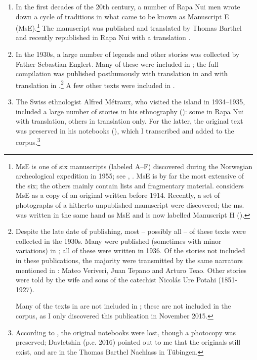 \newpage
\begin{enumerate}
\item 
In the first decades of the 20th century, a number of Rapa Nui men wrote down a cycle of traditions in what came to be known as Manuscript E (MsE).\footnote{\label{fn:27}MsE is one of six manuscripts (labeled A–F) discovered during the Norwegian archeological expedition in 1955; see \citet{Barthel1965}, \citet{HorleyLópezLabbé2014}. MsE is by far the most extensive of the six; the others mainly contain lists and fragmentary material. \citet[298]{Barthel1978} considers MsE as a copy of an original written before 1914. Recently, a set of photographs of a hitherto unpublished manuscript were discovered; the ms. was written in the same hand as MsE and is now labelled Manuscript H (\citealt{HorleyLópezLabbé2014,HorleyLópezLabbé2015}).} The manuscript was published and translated by Thomas Barthel \citep{Barthel1978} and recently republished in Rapa Nui with a  translation \citep{Frontier2008}. 

\item 
In the 1930s, a large number of legends and other stories was collected by Father Sebastian Englert. Many of these were included in \citet{Englert1939Huru1,Englert1939Huru2,Englert1939Tradiciones}; the full compilation was published posthumously with  translation in \citet{Englert1980} and with  translation in \citet{Englert2001}.\footnote{\label{fn:28}Despite the late date of publishing, most – possibly all – of these texts were collected in the 1930s. Many were published (sometimes with minor variations) in \citet{Englert1939Huru1,Englert1939Huru2,Englert1939Tradiciones}; all of these were written in 1936. Of the stories not included in these publications, the majority were transmitted by the same narrators mentioned in \citet{Englert1939Huru1,Englert1939Huru2,Englert1939Tradiciones}: Mateo Veriveri, Juan Tepano and Arturo Teao. Other stories were told by the wife and sons of the catechist Nicolás Ure Potahi (1851-1927). 

Many of the texts in \citet{Englert1939Huru2} are not included in \citet{Englert1980}; these are not included in the corpus, as I only discovered this publication in November 2015.} A few other texts were included in \citet{Englert1948}.

\item 
The Swiss ethnologist Alfred Métraux, who visited the island in 1934–1935, included a large number of stories in his ethnography (\citealt{Métraux1971}): some in Rapa Nui with translation, others in translation only. For the latter, the original text was preserved in his notebooks (\citealt{Métraux1935}), which I transcribed and added to the corpus.\footnote{\label{fn:29}According to \citet{Fischer2008Correspondence,Fischer2009}, the original notebooks were lost, though a photocopy was preserved; Davletshin (p.c. 2016) pointed out to me that the originals still exist, and are in the Thomas Barthel Nachlass in Tübingen.} 


\end{enumerate}
